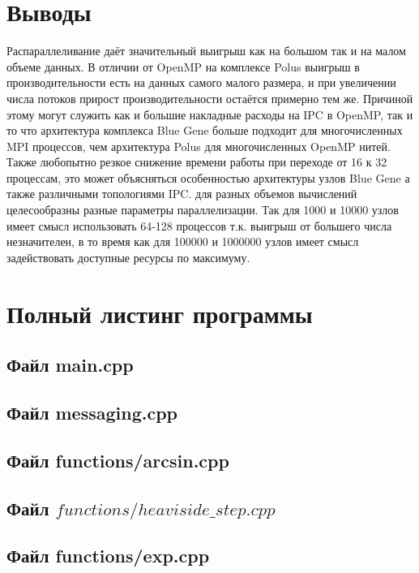 \documentclass[a4paper,12pt,titlepage,finall]{article}
\begin{document}
\section{Выводы}
Распараллеливание даёт значительный выигрыш как на большом так и на малом объеме данных. В отличии от OpenMP на комплексе Polus выигрыш в производительности есть на данных самого малого размера, и при увеличении числа потоков прирост производительности остаётся примерно тем же. Причиной этому могут служить как и большие накладные расходы на IPC в OpenMP, так и то что архитектура комплекса Blue Gene больше подходит для многочисленных MPI процессов, чем архитектура Polus для многочисленных OpenMP нитей. Также любопытно резкое снижение времени работы при переходе от 16 к 32 процессам, это может объясняться особенностью архитектуры узлов Blue Gene а также различными топологиями IPC. для разных объемов вычислений целесообразны разные параметры параллелизации. Так для 1000 и 10000 узлов имеет смысл использовать 64-128 процессов т.к. выигрыш от большего числа незначителен, в то время как для 100000 и 1000000 узлов имеет смысл задействовать доступные ресурсы по максимуму. 
\newpage
\section{Полный листинг программы} \label{source}
\subsection{Файл main.cpp}

\subsection{Файл messaging.cpp}

\subsection{Файл functions/arcsin.cpp}

\subsection{Файл $functions/heaviside\_step.cpp$}

\subsection{Файл functions/exp.cpp}

\end{document}
